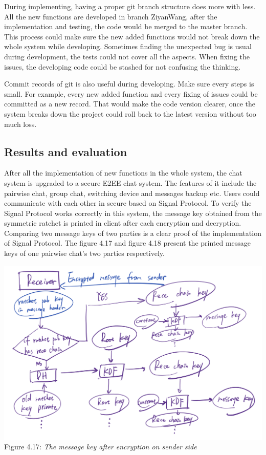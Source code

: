 During implementing, having a proper git branch structure does more with less. All the new functions are developed in branch ZiyanWang, after the implementation and testing, the code would be merged to the master branch. This process could make sure the new added functions would not break down the whole system while developing. Sometimes finding the unexpected bug is usual during development, the tests could not cover all the aspects. When fixing the issues, the developing code could be stashed for not confusing the thinking.

Commit records of git is also useful during developing. Make sure every steps is small. For example, every new added function and every fixing of issues could be committed as a new record. That would make the code version clearer, once the system breaks down the project could roll back to the latest version without too much loss.

\subsection{Results and evaluation}
After all the implementation of new functions in the whole system, the chat system is upgraded to a secure E2EE chat system. The features of it include the pairwise chat, group chat, switching device and messages backup etc. Users could communicate with each other in secure based on Signal Protocol. To verify the Signal Protocol works correctly in this system, the message key obtained from the symmetric ratchet is printed in client after each encryption and decryption. Comparing two message keys of two parties is a clear proof of the implementation of Signal Protocol. The figure 4.17 and figure 4.18 present the printed message keys of one pairwise chat's two parties respectively.

\begin{center}
\includegraphics[scale=.5]{../3-Background/resources/DH-rece.png}\\
Figure 4.17: \textit{The message key after encryption on sender side}
\end{center}

